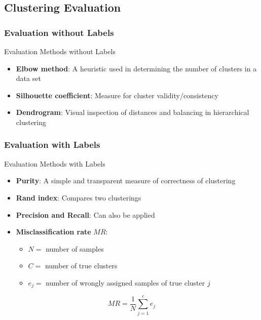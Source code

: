 
\subsection{Clustering Evaluation}

\subsubsection{Evaluation without Labels}

\begin{concept}{Evaluation Methods without Labels}
\begin{itemize}
    \item \textbf{Elbow method}: A heuristic used in determining the number of clusters in a data set
    \item \textbf{Silhouette coefficient}: Measure for cluster validity/consistency
    \item \textbf{Dendrogram}: Visual inspection of distances and balancing in hierarchical clustering
\end{itemize}
\end{concept}

\subsubsection{Evaluation with Labels}

\begin{concept}{Evaluation Methods with Labels}
\begin{itemize}
    \item \textbf{Purity}: A simple and transparent measure of correctness of clustering
    \item \textbf{Rand index}: Compares two clusterings
    \item \textbf{Precision and Recall}: Can also be applied
    \item \textbf{Misclassification rate} $MR$:
    \begin{itemize}
        \item $N =$ number of samples
        \item $C =$ number of true clusters
        \item $e_j =$ number of wrongly assigned samples of true cluster $j$
    \end{itemize}
\end{itemize}

$$MR = \frac{1}{N}\sum_{j=1}^{c}e_j$$
\end{concept}

